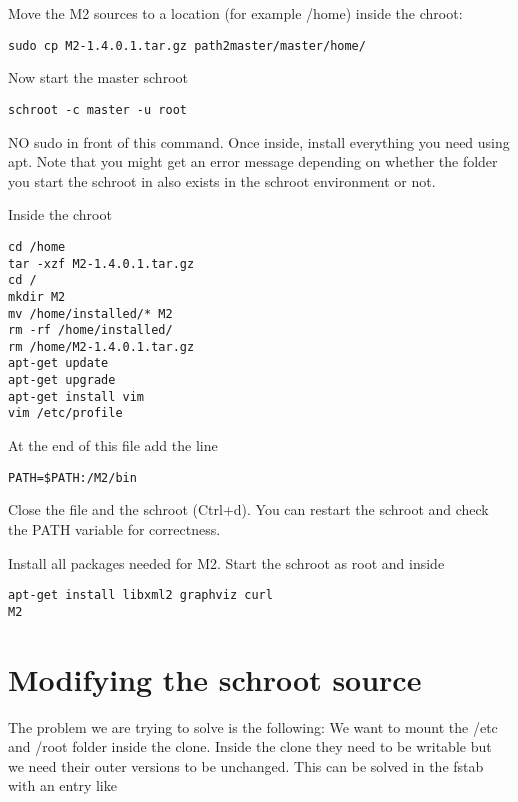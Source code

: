 \documentclass[a4paper]{book}
\begin{document}
Move the M2 sources to a location (for example /home) inside the chroot:

\begin{verbatim}
sudo cp M2-1.4.0.1.tar.gz path2master/master/home/
\end{verbatim}

Now start the master schroot

\begin{verbatim}
schroot -c master -u root
\end{verbatim}

NO sudo in front of this command. Once inside, install everything you need
using apt.  Note that you might get an error message depending on whether the
folder you start the schroot in also exists in the schroot environment or not.

Inside the chroot

\begin{verbatim}
cd /home
tar -xzf M2-1.4.0.1.tar.gz
cd /
mkdir M2
mv /home/installed/* M2
rm -rf /home/installed/
rm /home/M2-1.4.0.1.tar.gz
apt-get update
apt-get upgrade
apt-get install vim
vim /etc/profile
\end{verbatim}

At the end of this file add the line

\begin{verbatim}
PATH=$PATH:/M2/bin
\end{verbatim}

Close the file and the schroot (Ctrl+d). You can restart the schroot and check
the PATH variable for correctness.

Install all packages needed for M2. Start the schroot as root and inside

\begin{verbatim}
apt-get install libxml2 graphviz curl
M2
\end{verbatim}

\section{Modifying the schroot source}

The problem we are trying to solve is the following: We want to mount the /etc
and /root folder inside the clone. Inside the clone they need to be writable
but we need their outer versions to be unchanged.  This can be solved in the
fstab with an entry like
\end{document}
